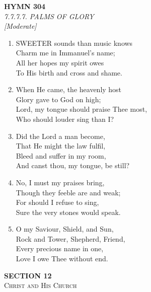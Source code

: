 \documentclass[11pt,a4paper]{article}
\begin{document}
\newpage
\begin{center}
    {\Large \textbf{HYMN 304}}
    \\
    \textit{7.7.7.7. PALMS OF GLORY}
    \\
    \textit{\small [Moderate]}
\end{center}
\vspace{1em}

\begin{enumerate}
    \item SWEETER sounds than music knows \\
        Charm me in Immanuel's name; \\
        All her hopes my spirit owes \\
        To His birth and cross and shame.

    \item When He came, the heavenly host \\
        Glory gave to God on high; \\
        Lord, my tongue should praise Thee most, \\
        Who should louder sing than I?

    \item Did the Lord a man become, \\
        That He might the law fulfil, \\
        Bleed and suffer in my room, \\
        And canst thou, my tongue, be still?

    \item No, I must my praises bring, \\
        Though they feeble are and weak; \\
        For should I refuse to sing, \\
        Sure the very stones would speak.

    \item O my Saviour, Shield, and Sun, \\
        Rock and Tower, Shepherd, Friend, \\
        Every precious name in one, \\
        Love I owe Thee without end.

\end{enumerate}

\newpage
\thispagestyle{empty}
\vspace*{3.5cm}
\begin{center}
    {\LARGE \textbf{SECTION 12}}\\[0.8em]
    {\Large \textsc{Christ and His Church}}
\end{center}
\vspace{3.5cm}
\end{document}
